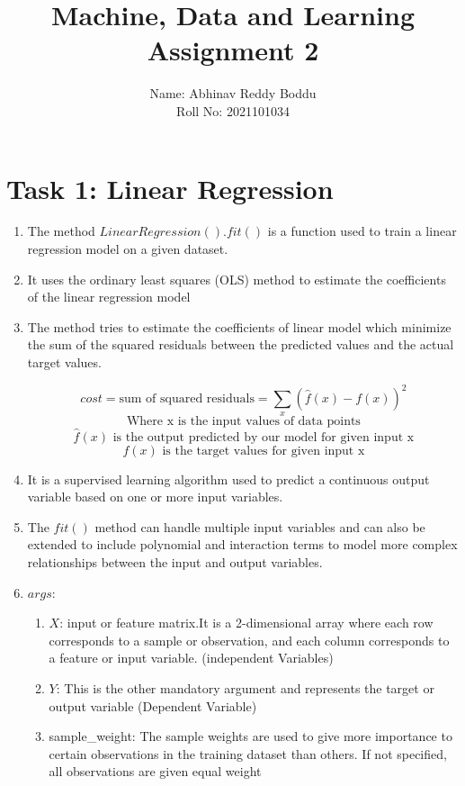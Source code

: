 \documentclass{article}
\title{Machine, Data and Learning\\
    Assignment 2
}
\author{
    \parbox{0.8\textwidth}{
        Name: Abhinav Reddy Boddu\\
        Roll No: 2021101034\\
    }
}
\date{}
\begin{document}
\maketitle

\section{Task 1: Linear Regression}

\begin{enumerate}
    \item The method $LinearRegression().fit()$ is a function used to train a linear regression model on a given dataset.

    \item  It uses the ordinary least squares (OLS) method to estimate the coefficients of the linear regression model
    \item The method tries to estimate the coefficients of linear model which minimize the sum of the squared residuals between the predicted values and the actual target values.

          \[cost=\mbox{sum of squared residuals} = \sum_{x}(\hat{f}(x) - f(x))^2\]
          \[\mbox{Where x is the input values of data points}\]
          \[\hat{f}(x) \mbox{ is the output predicted by our model for given input x}\]
          \[f(x) \mbox{ is the target values for given input x}\]

    \item It is a supervised learning algorithm used to predict a continuous output variable based on one or more input variables.
    \item The $fit()$ method can handle multiple input variables and can also be extended to include polynomial and interaction terms to model more complex relationships between the input and output variables.
    \item $args$:
        \begin{enumerate}
            \item $X$: input or feature matrix.It is a 2-dimensional array where each row corresponds to a sample or observation, and each column corresponds to a feature or input variable. (independent Variables)
            \item $Y$: This is the other mandatory argument and represents the target or output variable (Dependent Variable)
            \item sample\_weight: The sample weights are used to give more importance to certain observations in the training dataset than others. If not specified, all observations are given equal weight
        \end{enumerate}
\end{enumerate}
\end{document}
